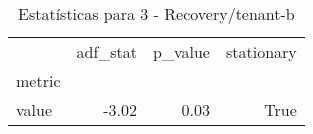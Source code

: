 \begin{table}[htbp]
\caption{Estatísticas para 3 - Recovery/tenant-b}
\label{tab:3_-_recovery_tenant-b_adf_test}
\begin{tabular}{lrrr}
\toprule
 & adf_stat & p_value & stationary \\
metric &  &  &  \\
\midrule
value & -3.02 & 0.03 & True \\
\bottomrule
\end{tabular}
\end{table}
